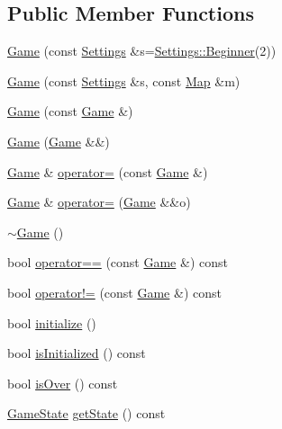\subsection*{Public Member Functions}
\begin{DoxyCompactItemize}
\item 
\hyperlink{classpan_1_1_game_a2c186c7ecac0fded27c7a9db4981a733}{Game} (const \hyperlink{classpan_1_1_settings}{Settings} \&s=\hyperlink{classpan_1_1_settings_a908b6305091cf8d02bb4179dcbbe4ad1}{Settings\+::\+Beginner}(2))
\item 
\hyperlink{classpan_1_1_game_a9dac7dcdc205455639eede641780b701}{Game} (const \hyperlink{classpan_1_1_settings}{Settings} \&s, const \hyperlink{classpan_1_1_map}{Map} \&m)
\item 
\hyperlink{classpan_1_1_game_a95d70ce4840b773525736ee5019433c6}{Game} (const \hyperlink{classpan_1_1_game}{Game} \&)
\item 
\hyperlink{classpan_1_1_game_aedf6e96723a924c772d88f8e7bbee4d8}{Game} (\hyperlink{classpan_1_1_game}{Game} \&\&)
\item 
\hyperlink{classpan_1_1_game}{Game} \& \hyperlink{classpan_1_1_game_a269b24bc583d51e598d22f93232c2f6a}{operator=} (const \hyperlink{classpan_1_1_game}{Game} \&)
\item 
\hyperlink{classpan_1_1_game}{Game} \& \hyperlink{classpan_1_1_game_a6e3665ea2ec133ed5ba0beefadbe688d}{operator=} (\hyperlink{classpan_1_1_game}{Game} \&\&o)
\item 
\hyperlink{classpan_1_1_game_a9ddb30d0a2303334c87048284fa57a63}{$\sim$\+Game} ()
\item 
bool \hyperlink{classpan_1_1_game_a674b783428470d9831cfa79bca8fe0c9}{operator==} (const \hyperlink{classpan_1_1_game}{Game} \&) const
\item 
bool \hyperlink{classpan_1_1_game_a5316baca3fd1487c80759343b0df574a}{operator!=} (const \hyperlink{classpan_1_1_game}{Game} \&) const
\item 
bool \hyperlink{classpan_1_1_game_a164829a91c20f0f1f7b2d32e76e370f2}{initialize} ()
\item 
bool \hyperlink{classpan_1_1_game_a145be880607e15e9ca91ceb36a012de1}{is\+Initialized} () const
\item 
bool \hyperlink{classpan_1_1_game_aa662e441f8910685ef4eb61f76f22354}{is\+Over} () const
\item 
\hyperlink{namespacepan_a6f99370eda3b27c2bbe19b2dacea9212}{Game\+State} \hyperlink{classpan_1_1_game_a1cfa652ea64fb2cb16ded47cec2ea471}{get\+State} () const
\item 

\end{DoxyCompactItemize}
